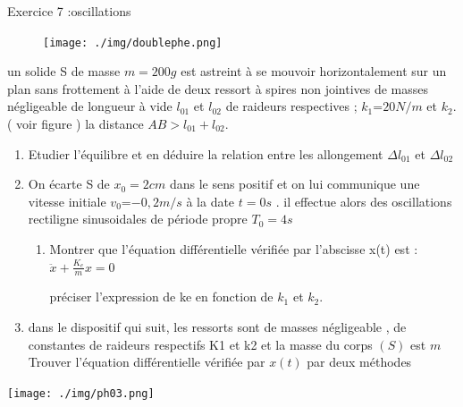 \documentclass[12pt, french]{article}
\begin{document}
\begin{Box2}{Exercice 7 :oscillations}
\begin{figure}
  \begin{center}
	  \vspace{-0.6cm}
	\texttt{[image: ./img/doublephe.png]}
  \end{center}
\end{figure}

un solide S de masse $m = 200g$ est astreint à se mouvoir horizontalement sur un plan sans frottement à l’aide
     de deux ressort à spires non jointives de masses négligeable de longueur à vide $l_{01}$ et $l_{02}$ de raideurs respectives ;
     $k_1 $=$20N/m$ et $k_2$.( voir figure ) la distance $AB > l_{01} + l_{02}$.
\begin{enumerate}
  \item Etudier l’équilibre et en déduire la relation entre les allongement $\Delta{l_{01}}$ et $\Delta{l_{02}}$
  \item On écarte S de $x_0 = 2cm$ dans le sens positif et on lui communique une vitesse initiale $v_0 $=$-0, 2m/s$ à la
date $t = 0s$ . il effectue alors des oscillations rectiligne sinusoidales de période propre $T_0 = 4s$
\begin{enumerate}
  \item Montrer que l’équation différentielle vérifiée par l’abscisse x(t) est :$\ddot{x} + \frac{K_e}{m}x = 0$

    préciser l’expression de ke en fonction de $k_1$ et $k_2$.
  
\end{enumerate}
\item dans le dispositif qui suit, les ressorts sont de masses négligeable , de constantes de raideurs respectifs K1 et k2 et
la masse du corps $(S)$ est $m$ Trouver l’équation différentielle vérifiée par $x(t)$ par deux méthodes

\end{enumerate}
  \begin{center}
	  \vspace{-0.6cm}
	\texttt{[image: ./img/ph03.png]}
  \end{center}

\end{Box2}
\end{document}
